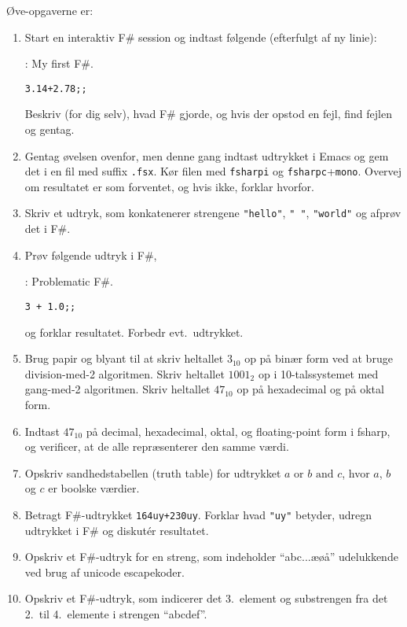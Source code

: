 \documentclass[a4paper,12pt]{article}
\begin{document}
Øve-opgaverne er:
\begin{enumerate}[label=2ø.\arabic*,start=0]
\item Start en interaktiv F\# session og indtast følgende (efterfulgt af ny linie):
  \begin{codeNOutput}{: My first F\#.}
\begin{lstlisting}
3.14+2.78;;
\end{lstlisting}
  \end{codeNOutput}
  Beskriv (for dig selv), hvad F\# gjorde, og hvis der opstod en fejl, find fejlen og gentag.
\item Gentag øvelsen ovenfor, men denne gang indtast udtrykket i Emacs og gem det i en fil med suffix \verb|.fsx|. Kør filen med \lstinline[language=console]{fsharpi} og \lstinline[language=console]{fsharpc}+\lstinline[language=console]{mono}. Overvej om resultatet er som forventet, og hvis ikke, forklar hvorfor.
\item Skriv et udtryk, som konkatenerer strengene \lstinline{"hello"}, \lstinline{" "}, \lstinline{"world"} og afprøv det i F\#.
\item Prøv følgende udtryk i F\#,
  \begin{codeNOutput}{: Problematic F\#.}
\begin{lstlisting}
3 + 1.0;;
\end{lstlisting}
\end{codeNOutput}
og forklar resultatet. Forbedr evt.\ udtrykket.
\item Brug papir og blyant til at skriv heltallet $3_{10}$ op på binær form ved at bruge division-med-2 algoritmen. Skriv heltallet $1001_2$ op i 10-talssystemet med gang-med-2 algoritmen. Skriv heltallet $47_{10}$ op på hexadecimal og på oktal form.
\item Indtast $47_{10}$ på decimal, hexadecimal, oktal, og floating-point form i fsharp, og verificer, at de alle repræsenterer den samme værdi.
\item Opskriv sandhedstabellen (truth table) for udtrykket $a \text{ or } b \text{ and } c$, hvor $a$, $b$ og $c$ er boolske værdier.
\item Betragt F\#-udtrykket \lstinline{164uy+230uy}. Forklar hvad \lstinline{"uy"} betyder, udregn udtrykket i F\# og diskut\'{e}r resultatet.
\item Opskriv et F\#-udtryk for en streng, som indeholder ``abc...æøå'' udelukkende ved brug af unicode escapekoder.
\item Opskriv et F\#-udtryk, som indicerer det 3.\ element og substrengen fra det 2.\ til 4.\ elemente i strengen ``abcdef''.
\end{enumerate}
\end{document}
